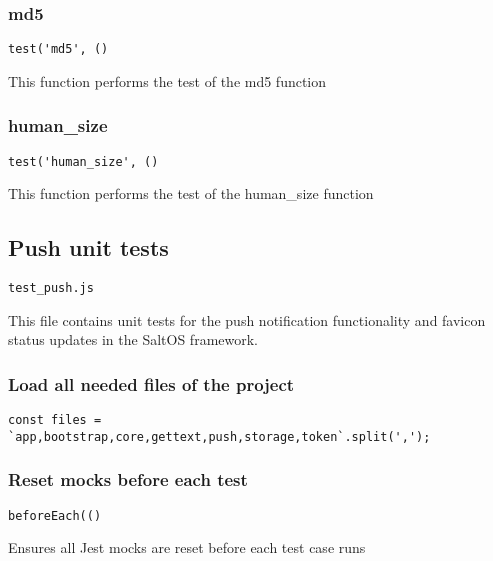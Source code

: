 \documentclass[a4paper]{article}
\begin{document}
\hypertarget{toc239}{}
\subsubsection{md5}

\begin{lstlisting}
test('md5', ()
\end{lstlisting}

This function performs the test of the md5 function

\hypertarget{toc240}{}
\subsubsection{human\_size}

\begin{lstlisting}
test('human_size', ()
\end{lstlisting}

This function performs the test of the human\_size function

\hypertarget{toc241}{}
\subsection{Push unit tests}

\begin{lstlisting}
test_push.js
\end{lstlisting}

This file contains unit tests for the push notification functionality
and favicon status updates in the SaltOS framework.

\hypertarget{toc242}{}
\subsubsection{Load all needed files of the project}

\begin{lstlisting}
const files = `app,bootstrap,core,gettext,push,storage,token`.split(',');
\end{lstlisting}

\hypertarget{toc243}{}
\subsubsection{Reset mocks before each test}

\begin{lstlisting}
beforeEach(()
\end{lstlisting}

Ensures all Jest mocks are reset before each test case runs
\end{document}
